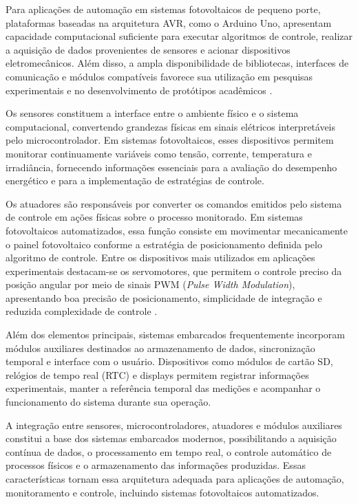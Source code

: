 Para aplicações de automação em sistemas fotovoltaicos de pequeno porte, plataformas baseadas na arquitetura AVR, como o Arduino Uno, apresentam capacidade computacional suficiente para executar algoritmos de controle, realizar a aquisição de dados provenientes de sensores e acionar dispositivos eletromecânicos. Além disso, a ampla disponibilidade de bibliotecas, interfaces de comunicação e módulos compatíveis favorece sua utilização em pesquisas experimentais e no desenvolvimento de protótipos acadêmicos \cite{arduino2023}.

Os sensores constituem a interface entre o ambiente físico e o sistema computacional, convertendo grandezas físicas em sinais elétricos interpretáveis pelo microcontrolador. Em sistemas fotovoltaicos, esses dispositivos permitem monitorar continuamente variáveis como tensão, corrente, temperatura e irradiância, fornecendo informações essenciais para a avaliação do desempenho energético e para a implementação de estratégias de controle.

Os atuadores são responsáveis por converter os comandos emitidos pelo sistema de controle em ações físicas sobre o processo monitorado. Em sistemas fotovoltaicos automatizados, essa função consiste em movimentar mecanicamente o painel fotovoltaico conforme a estratégia de posicionamento definida pelo algoritmo de controle. Entre os dispositivos mais utilizados em aplicações experimentais destacam-se os servomotores, que permitem o controle preciso da posição angular por meio de sinais PWM (\textit{Pulse Width Modulation}), apresentando boa precisão de posicionamento, simplicidade de integração e reduzida complexidade de controle \cite{arduino2023} .

Além dos elementos principais, sistemas embarcados frequentemente incorporam módulos auxiliares destinados ao armazenamento de dados, sincronização temporal e interface com o usuário. Dispositivos como módulos de cartão SD, relógios de tempo real (RTC) e displays permitem registrar informações experimentais, manter a referência temporal das medições e acompanhar o funcionamento do sistema durante sua operação.

A integração entre sensores, microcontroladores, atuadores e módulos auxiliares constitui a base dos sistemas embarcados modernos, possibilitando a aquisição contínua de dados, o processamento em tempo real, o controle automático de processos físicos e o armazenamento das informações produzidas. Essas características tornam essa arquitetura adequada para aplicações de automação, monitoramento e controle, incluindo sistemas fotovoltaicos automatizados.
